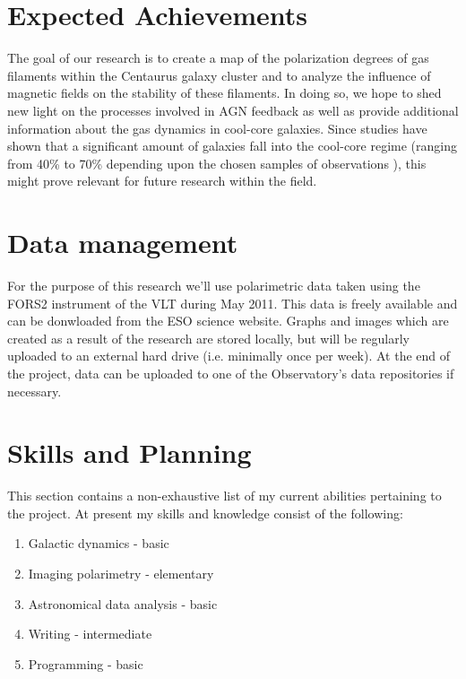 \documentclass[twoside,single]{lion-msc}
\begin{document}
    
   
\chapter{Expected Achievements}

    The goal of our research is to create a map of the polarization degrees of gas filaments within the Centaurus galaxy cluster and to analyze the influence of magnetic fields on the stability of these filaments. In doing so, we hope to shed new light on the processes involved in AGN feedback as well as provide additional information about the gas dynamics in cool-core galaxies. Since studies have shown that a significant amount of galaxies fall into the cool-core regime (ranging from 40\% to 70\% depending upon the chosen samples of observations \citep{Hudson2010, Chen2007, Sanderson2008}), this might prove relevant for future research within the field.
    
    
 
\chapter{Data management}

    For the purpose of this research we'll use polarimetric data taken using the FORS2 instrument of the VLT during May 2011. This data is freely available and can be donwloaded from the ESO science website. Graphs and images which are created as a result of the research are stored locally, but will be regularly uploaded to an external hard drive (i.e. minimally once per week). At the end of the project, data can be uploaded to one of the Observatory's data repositories if necessary.
    
    
    
\chapter{Skills and Planning}
    
    This section contains a non-exhaustive list of my current abilities pertaining to the project. At present my skills and knowledge consist of the following:
    
    \begin{enumerate}
        \item Galactic dynamics - basic
        \item Imaging polarimetry - elementary
        \item Astronomical data analysis - basic
        \item Writing - intermediate
        \item Programming - basic
    \end{enumerate}
    
\end{document}
